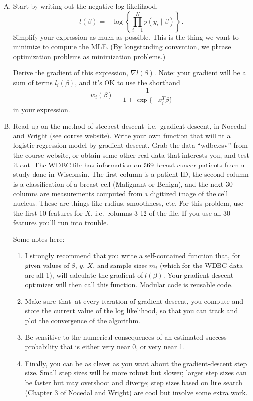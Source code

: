 \documentclass{mynotes}
\begin{document}
\begin{enumerate}[(A)]
\item Start by writing out the negative log likelihood,
$$
l(\beta) = - \log \left \{ \prod_{i=1}^N p(y_i \mid \beta) \right \} \, .
$$
Simplify your expression as much as possible. This is the thing we want to minimize to compute the MLE.  (By longstanding convention, we phrase optimization problems as minimization problems.)

Derive the gradient of this expression, $\nabla l(\beta)$.   Note: your gradient will be a sum of terms $l_i(\beta)$, and it's OK to use the shorthand
$$
w_i(\beta) =  \frac{1}{1 + \exp\{-x_i^T \beta\}}
$$
in your expression.


\item Read up on the method of steepest descent, i.e.~gradient descent, in Nocedal and Wright (see course website).  Write your own function that will fit a logistic regression model by gradient descent.  Grab the data ``wdbc.csv'' from the course website, or obtain some other real data that interests you, and test it out.  The WDBC file has information on 569 breast-cancer patients from a study done in Wisconsin.  The first column is a patient ID, the second column is a classification of a breast cell (Malignant or Benign), and the next 30 columns are measurements computed from a digitized image of the cell nucleus.  These are things like radius, smoothness, etc.  For this problem, use the first 10 features for $X$, i.e.~columns 3-12 of the file.  If you use all 30 features you'll run into trouble.

Some notes here:
\begin{enumerate}[1.]
\item I strongly recommend that you write a self-contained function that, for given values of $\beta$, $y$, $X$, and sample sizes $m_i$ (which for the WDBC data are all 1), will calculate the gradient of $l(\beta)$.  Your gradient-descent optimizer will then call this function.  Modular code is reusable code.
\item Make sure that, at every iteration of gradient descent, you compute and store the current value of the log likelihood, so that you can track and plot the convergence of the algorithm.
\item Be sensitive to the numerical consequences of an estimated success probability that is either very near 0, or very near 1.
\item Finally, you can be as clever as you want about the gradient-descent step size.  Small step sizes will be more robust but slower; larger step sizes can be faster but may overshoot and diverge; step sizes based on line search (Chapter 3 of Nocedal and Wright) are cool but involve some extra work.
\end{enumerate}



\end{enumerate}
\end{document}
